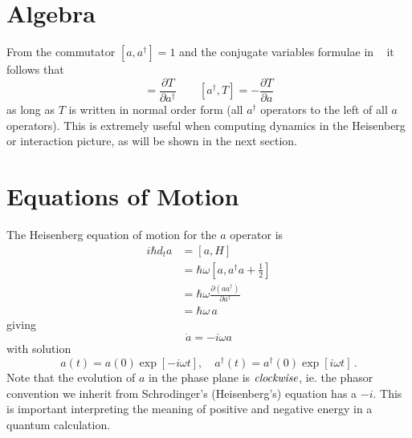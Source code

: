 \section{Algebra}

From the commutator $ [a,a^{\dagger}]=1 $ and the conjugate variables formulae in \citeinternaltype~ it follows that \begin{equation}
[a,T] = \frac{\partial T}{\partial a^{\dagger}} \qquad [a^{\dagger},T] = -\frac{\partial T}{\partial a}\end{equation}
as long as $T$ is written in normal order form (all $a^{\dagger}$ operators to the left of all $a$ operators).
This is extremely useful when computing dynamics in the Heisenberg or interaction picture, as will be shown in the next section.

\section{Equations of Motion}

The Heisenberg equation of motion for the $a$ operator is
\begin{align*}
  i\hbar d_{t}a
  &= [a,H] \\
  &= \hbar \omega [a,a^{\dagger}a+\frac{1}{2}] \\
  &= \hbar \omega \frac{\partial(aa^{\dagger})}{\partial a^{\dagger}} \\
  &= \hbar \omega \,a
\end{align*}
giving
\begin{equation*}
  \dot{a} = -i \omega a
\end{equation*}
with solution
\begin{equation}
a(t) = a(0)\exp\left[-i \omega t \right],
\quad
a^{\dagger}(t) = a^{\dagger}(0)\exp\left[i \omega t \right] \, .
\end{equation}
Note that the evolution of $a$ in the phase plane is $\emph{clockwise}$, ie. the phasor convention we inherit from Schrodinger's (Heisenberg's) equation has a $-i$.
This is important interpreting the meaning of positive and negative energy in a quantum calculation.

